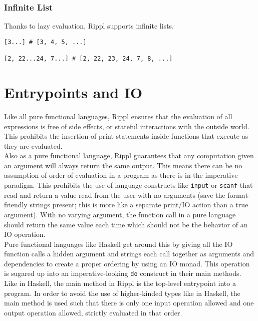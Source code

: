 \documentclass[5pt]{article}
\begin{document}
\subsubsection{Infinite List}
Thanks to lazy evaluation, Rippl supports infinite lists. 

\begin{lstlisting}[language=rippl]
[3...] # [3, 4, 5, ...] 

[2, 22...24, 7...] # [2, 22, 23, 24, 7, 8, ...]
\end{lstlisting}
\section{Entrypoints and IO}
Like all pure functional languages, Rippl ensures that the evaluation of all expressions is free of side effects, or stateful interactions with the outside world. This prohibits the insertion of print statements inside functions that execute as they are evaluated. \\

Also as a pure functional language, Rippl guarantees that any computation given an argument will always return the same output. This means there can be no assumption of order of evaluation in a program as there is in the imperative paradigm. This prohibits the use of language constructs like \texttt{input} or \texttt{scanf} that read and return a value read from the user with no arguments (save the format-friendly strings present; this is more like a separate print/IO action than a true argument). With no varying argument, the function call in a pure language should return the same value each time which should not be the behavior of an IO operation. \\

Pure functional languages like Haskell get around this by giving all the IO function calls a hidden argument and strings each call together as arguments and dependencies to create a proper ordering by using an IO monad. This operation is sugared up into an imperative-looking \texttt{do} construct in their main methods. \\

Like in Haskell, the main method in Rippl is the top-level entrypoint into a program. In order to avoid the use of higher-kinded types like in Haskell, the main method is used such that there is only one input operation allowed and one output operation allowed, strictly evaluated in that order.  \\
\end{document}
